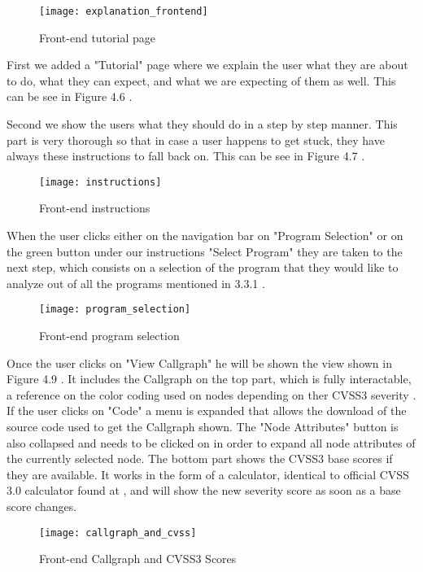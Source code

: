 \begin{figure}[H]
	\caption{Front-end tutorial page}
	\centering
	\texttt{[image: explanation\_frontend]}
\end{figure}

First we added a "Tutorial" page where we explain the user what they are about to do, what they can expect, and what we are expecting of them as well. This can be see in Figure 4.6 .

Second we show the users what they should do in a step by step manner. This part is very thorough so that in case a user happens to get stuck, they have always these instructions to fall back on. This can be see in Figure 4.7 .

\begin{figure}[H]
	\caption{Front-end instructions}
	\centering
	\texttt{[image: instructions]}
\end{figure}

When the user clicks either on the navigation bar on "Program Selection" or on the green button under our instructions "Select Program" they are taken to the next step, which consists on a selection of the program that they would like to analyze out of all the programs mentioned in 3.3.1 . 

\begin{figure}[H]
	\caption{Front-end program selection}
	\centering
	\texttt{[image: program\_selection]}
\end{figure}

Once the user clicks on "View Callgraph" he will be shown the view shown in Figure 4.9 . It includes the Callgraph on the top part, which is fully interactable, a reference on the color coding used on nodes depending on ther CVSS3 severity \parencite{cvss3}. If the user clicks on "Code" a menu is expanded that allows the download of the source code used to get the Callgraph shown. The "Node Attributes" button is also collapsed and needs to be clicked on in order to expand all node attributes of the currently selected node. The bottom part shows the CVSS3 base scores if they are available. It works in the form of a calculator, identical to official CVSS 3.0 calculator found at \parencite{cvss3}, and will show the new severity score as soon as a base score changes. 

\begin{figure}[H]
	\caption{Front-end Callgraph and CVSS3 Scores}
	\centering
	\texttt{[image: callgraph\_and\_cvss]}
\end{figure}

